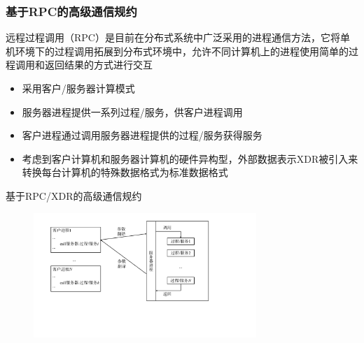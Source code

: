 \documentclass[cs4size,a4paper,10pt]{ctexart}
\begin{document}
	\subsubsection{基于RPC的高级通信规约}
	远程过程调用（RPC）是目前在分布式系统中广泛采用的进程通信方法，它将单机环境下的过程调用拓展到分布式环境中，允许不同计算机上的进程使用简单的过程调用和返回结果的方式进行交互
	\begin{itemize}
		\item 采用客户/服务器计算模式
		\item 服务器进程提供一系列过程/服务，供客户进程调用
		\item 客户进程通过调用服务器进程提供的过程/服务获得服务
		\item 考虑到客户计算机和服务器计算机的硬件异构型，外部数据表示XDR被引入来转换每台计算机的特殊数据格式为标准数据格式
	\end{itemize}

	基于RPC/XDR的高级通信规约
	\begin{figure}[H]
		\centering
		\includegraphics[width=0.75\textwidth]{img/基于RPC XDR的高级通信规约.pdf}
	\end{figure}
\end{document}
